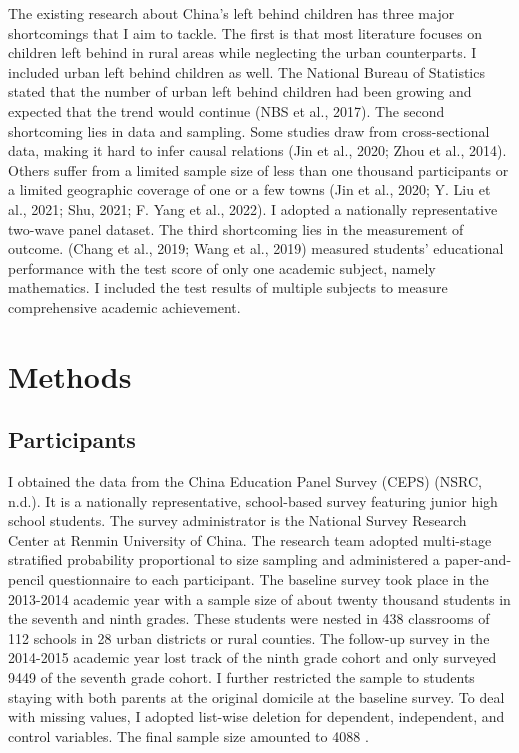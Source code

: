 \documentclass[
  man,floatsintext]{apa7}
\begin{document}
The existing research about China's left behind children has three major shortcomings that I aim to tackle. The first is that most literature focuses on children left behind in rural areas while neglecting the urban counterparts. I included urban left behind children as well. The National Bureau of Statistics stated that the number of urban left behind children had been growing and expected that the trend would continue (NBS et al., 2017). The second shortcoming lies in data and sampling. Some studies draw from cross-sectional data, making it hard to infer causal relations (Jin et al., 2020; Zhou et al., 2014). Others suffer from a limited sample size of less than one thousand participants or a limited geographic coverage of one or a few towns (Jin et al., 2020; Y. Liu et al., 2021; Shu, 2021; F. Yang et al., 2022). I adopted a nationally representative two-wave panel dataset. The third shortcoming lies in the measurement of outcome. (Chang et al., 2019; Wang et al., 2019) measured students' educational performance with the test score of only one academic subject, namely mathematics. I included the test results of multiple subjects to measure comprehensive academic achievement.

\newpage

\hypertarget{methods}{%
\section{Methods}\label{methods}}

\hypertarget{participants}{%
\subsection{Participants}\label{participants}}

I obtained the data from the China Education Panel Survey (CEPS) (NSRC, n.d.). It is a nationally representative, school-based survey featuring junior high school students. The survey administrator is the National Survey Research Center at Renmin University of China. The research team adopted multi-stage stratified probability proportional to size sampling and administered a paper-and-pencil questionnaire to each participant. The baseline survey took place in the 2013-2014 academic year with a sample size of about twenty thousand students in the seventh and ninth grades. These students were nested in 438 classrooms of 112 schools in 28 urban districts or rural counties. The follow-up survey in the 2014-2015 academic year lost track of the ninth grade cohort and only surveyed 9449 of the seventh grade cohort. I further restricted the sample to students staying with both parents at the original domicile at the baseline survey. To deal with missing values, I adopted list-wise deletion for dependent, independent, and control variables. The final sample size amounted to 4088 .
\end{document}
